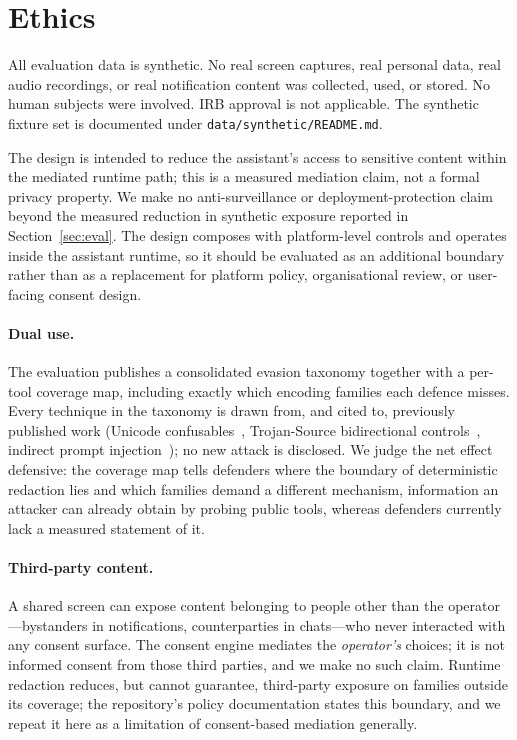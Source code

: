 \documentclass[pdflatex,sn-mathphys-num]{sn-jnl}
\begin{document}
\section{Ethics}\label{sec:ethics}

All evaluation data is synthetic. No real screen captures, real personal data,
real audio recordings, or real notification content was collected, used, or
stored. No human subjects were involved. IRB approval is not applicable. The
synthetic fixture set is documented under \texttt{data/synthetic/README.md}.

The design is intended to reduce the assistant's access to sensitive content
within the mediated runtime path; this is a measured mediation claim, not a
formal privacy property. We make no anti-surveillance or
deployment-protection claim beyond the measured reduction in synthetic
exposure reported in Section~\ref{sec:eval}. The design composes with
platform-level controls and operates inside the assistant runtime, so it should
be evaluated as an additional boundary rather than as a replacement for platform
policy, organisational review, or user-facing consent design.

\paragraph{Dual use.} The evaluation publishes a consolidated evasion taxonomy
together with a per-tool coverage map, including exactly which encoding families
each defence misses. Every technique in the taxonomy is drawn from, and cited
to, previously published work (Unicode confusables~\cite{unicode_tr39},
Trojan-Source bidirectional controls~\cite{boucher2023trojansource},
indirect prompt injection~\cite{greshake2023indirect}); no new attack is
disclosed. We judge the net effect defensive: the coverage map tells defenders
where the boundary of deterministic redaction lies and which families demand a
different mechanism, information an attacker can already obtain by probing
public tools, whereas defenders currently lack a measured statement of it.

\paragraph{Third-party content.} A shared screen can expose content belonging to
people other than the operator---bystanders in notifications, counterparties in
chats---who never interacted with any consent surface. The consent engine
mediates the \textit{operator's} choices; it is not informed consent from those
third parties, and we make no such claim. Runtime redaction reduces, but cannot
guarantee, third-party exposure on families outside its coverage; the
repository's policy documentation states this boundary, and we repeat it here as
a limitation of consent-based mediation generally.
\end{document}
